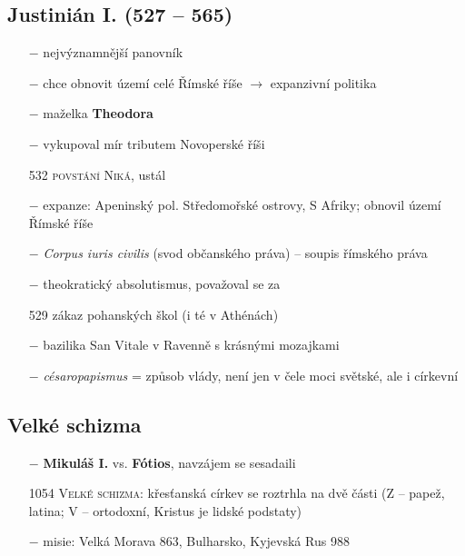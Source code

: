\documentclass{article}
\begin{document}
\subsection*{Justinián I. (527 -- 565)}
\begin{itemize}
    \vspace{-0.5em}
    \setlength\itemsep{0.15em}
    \item[$-$] nejvýznamnější panovník
    \item[$-$] chce obnovit území celé Římské říše $\rightarrow$ expanzivní politika
    \item[$-$] maželka \textbf{Theodora}
    \item[$-$] vykupoval mír tributem Novoperské říši
    \item[532] \textsc{povstání Niká}, ustál
    \item[$-$] expanze: Apeninský pol. Středomořské ostrovy, S Afriky; obnovil území Římské říše
    \item[$-$] \textit{Corpus iuris civilis} (svod občanského práva) -- soupis římského práva
    \item[$-$] theokratický absolutismus, považoval se za 
    \item[529] zákaz pohanských škol (i té v Athénách)
    \item[$-$] bazilika San Vitale v Ravenně s krásnými mozajkami
    \item[$-$] \textit{césaropapismus} = způsob vlády, není jen v čele moci světské, ale i církevní
\end{itemize}

\subsection*{Velké schizma}
\begin{itemize}
    \vspace{-0.5em}
    \setlength\itemsep{0.15em}
    \item[$-$] \textbf{Mikuláš I.} vs. \textbf{Fótios}, navzájem se sesadaili
    \item[1054] \textsc{Velké schizma}: křesťanská církev se roztrhla na dvě části (Z -- papež, latina; V -- ortodoxní, Kristus je lidské podstaty)
    \item[$-$] misie: Velká Morava 863, Bulharsko, Kyjevská Rus 988
\end{itemize}
\end{document}
